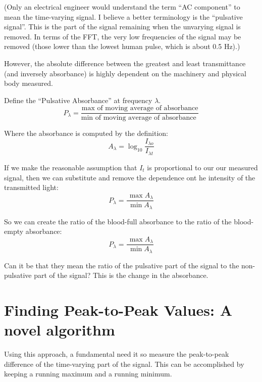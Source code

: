 \documentclass[11pt]{article}
\renewcommand{\min}{\expandafter\,\operatorname*{min}}
\renewcommand{\max}{\expandafter\,\operatorname*{max}}
\begin{document}
(Only an electrical engineer would understand the term ``AC component'' to
mean the time-varying signal. I believe a better terminology is the
``pulsative signal''. This is the part of the signal remaining when the
unvarying signal is removed. In terms of the FFT, the very low frequencies
of the signal may be removed (those lower than the lowest human pulse, which
is about 0.5 Hz).)

However, the absolute difference between the greatest and least
transmittance (and inversely absorbance) is highly dependent on the
machinery and physical body measured.

Define the ``Pulsative Absorbance'' at frequency $\lambda$. 
\begin{equation}
  P_{\lambda} = \frac{\text{max of moving average of absorbance}}
  {\text{min of moving average of absorbance }}
\end{equation}

Where the absorbance is computed by the definition:
\begin{equation}
 A_{\lambda} = \log_{10} \frac{I_{\lambda o}}{I_{\lambda t}}   
\end{equation}

If we make the reasonable assumption that $I_t$ is proportional
to our our measured signal, then we can substitute and
remove the dependence ont he intensity of the transmitted light:
\begin{equation}
  P_{\lambda} = \frac{\max{A_{\lambda}}}
  {\min{A_{\lambda}}}
\end{equation}

So we can create the ratio of the blood-full absorbance
to the ratio of the blood-empty absorbance:
\begin{equation}
  P_{\lambda} = \frac{\max{A_{\lambda}}}
  {\min{A_{\lambda}}}
\end{equation}




Can it be that they mean the ratio of the pulsative part of the signal
to the non-pulsative part of the signal?  This is the change in
the absorbance.



\section{Finding Peak-to-Peak Values: A novel algorithm}

Using this approach, a fundamental need it so measure the peak-to-peak difference of
the time-varying part of the signal. This can be accomplished by keeping a running
maximum and a running minimum.
\end{document}
